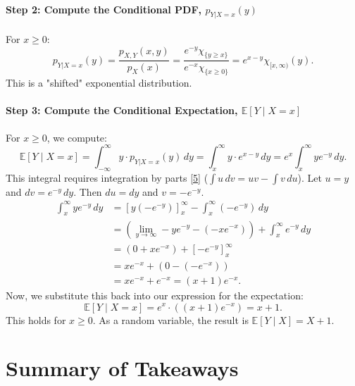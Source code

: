 \documentclass[11pt,a4paper]{article}
\begin{document}
\paragraph{Step 2: Compute the Conditional PDF, $p_{Y|X=x}(y)$}
For $x \ge 0$:
\[
p_{Y|X=x}(y) = \frac{p_{X,Y}(x,y)}{p_X(x)} = \frac{e^{-y} \chi_{\{y \ge x\}}}{e^{-x} \chi_{\{x \ge 0\}}} = e^{x-y} \chi_{[x, \infty)}(y).
\]
This is a "shifted" exponential distribution.

\paragraph{Step 3: Compute the Conditional Expectation, $\mathbb{E}[Y \mid X=x]$}
For $x \ge 0$, we compute:
\[
\mathbb{E}[Y \mid X=x] = \int_{-\infty}^{\infty} y \cdot p_{Y|X=x}(y) \,dy = \int_{x}^{\infty} y \cdot e^{x-y} \,dy = e^x \int_{x}^{\infty} y e^{-y} \,dy.
\]
This integral requires integration by parts \hyperlink{ref:ibp}{[5]} ($\int u \,dv = uv - \int v \,du$).
Let $u = y$ and $dv = e^{-y} \,dy$. Then $du = dy$ and $v = -e^{-y}$.
\begin{align*}
    \int_{x}^{\infty} y e^{-y} \,dy &= \left[ y(-e^{-y}) \right]_{x}^{\infty} - \int_{x}^{\infty} (-e^{-y}) \,dy \\
    &= \left( \lim_{y\to\infty} -ye^{-y} - (-xe^{-x}) \right) + \int_{x}^{\infty} e^{-y} \,dy \\
    &= (0 + xe^{-x}) + \left[ -e^{-y} \right]_{x}^{\infty} \\
    &= xe^{-x} + (0 - (-e^{-x})) \\
    &= xe^{-x} + e^{-x} = (x+1)e^{-x}.
\end{align*}
Now, we substitute this back into our expression for the expectation:
\[
\mathbb{E}[Y \mid X=x] = e^x \cdot \left( (x+1)e^{-x} \right) = x+1.
\]
This holds for $x \ge 0$. As a random variable, the result is $\mathbb{E}[Y \mid X] = X+1$.

\newpage

\section{Summary of Takeaways}
\end{document}
